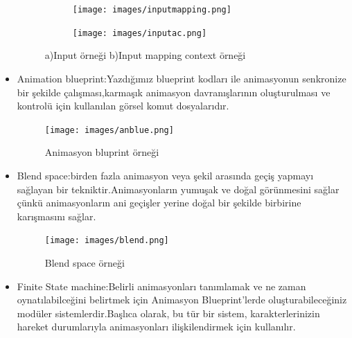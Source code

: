 \documentclass[12pt,a4paper]{article}
\begin{document}
\begin{itemize}
\begin{center}
\begin{figure}[htbp]
\begin{subfigure}[t]{0.7\textwidth}
						\label{fig:ornek1}
						
						\centering
						\texttt{[image: images/inputmapping.png]}
							\caption{}
					\end{subfigure}
					\begin{subfigure}[t]{0.7\textwidth}
					
						\label{fig:ornek2}
						
						\centering
						\texttt{[image: images/inputac.png]}
							\caption{}
					\end{subfigure}
					\caption{a)Input örneği   b)Input mapping context örneği}
					\label{fig:ornekler}
				\end{figure}
			\end{center}
		
			
		
			\item Animation blueprint:Yazdığımız blueprint kodları ile  animasyonun senkronize bir şekilde çalışması,karmaşık animasyon davranışlarının oluşturulması ve kontrolü için kullanılan görsel komut dosyalarıdır.			
		\begin{center}
			\begin{figure}[!htbp]
				\texttt{[image: images/anblue.png]}
				\caption{Animasyon bluprint  örneği}
				\label{fig:ornek}
			\end{figure}
	 	\end{center}
		
			\item Blend space:birden fazla animasyon veya şekil arasında geçiş yapmayı sağlayan bir tekniktir.Animasyonların yumuşak ve doğal görünmesini sağlar çünkü animasyonların ani geçişler yerine doğal bir şekilde birbirine karışmasını sağlar.
			\begin{center}
				\begin{figure}[!htbp]
				\texttt{[image: images/blend.png]}
				\caption{Blend space  örneği}
				\label{fig:ornek}
			\end{figure}
			\end{center}
		
			\item Finite State machine:Belirli animasyonları tanımlamak ve ne zaman oynatılabilceğini belirtmek için Animasyon Blueprint'lerde oluşturabileceğiniz modüler sistemlerdir.Başlıca olarak, bu tür bir sistem, karakterlerinizin hareket durumlarıyla animasyonları ilişkilendirmek için kullanılır.
	\begin{center}
		\begin{figure}[htbp]
		\centering
		

\end{figure}
\end{center}
\end{itemize}
\end{document}
